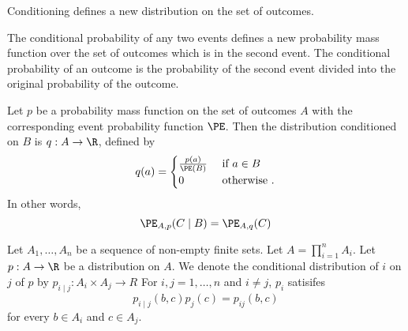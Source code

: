 

Conditioning defines a new distribution on the set of outcomes.


The conditional probability
of any two events
defines a new probability
mass function over the
set of outcomes
which is in the second
event.
The conditional probability
of an outcome
is the probability of the
second event
divided into the original probability
of the outcome.


Let $p$ be a probability
mass function on the set of
outcomes $A$ with the corresponding
event probability function $\PE$.
Then the distribution conditioned on $B$ is $q: A \to \R$, defined by
\[
  q(a) = \begin{cases}
    \frac{p(a)}{\PE(B)} & \text{ if } a \in B \\
    0 & \text{ otherwise }.
  \end{cases}
\]
In other words,
\[
   \PE_{A, p}(C \mid B) = \PE_{A,q}(C)
\]



Let $A_1, \dots, A_n$ be a sequence of non-empty finite sets.
Let $A = \prod_{i = 1}^{n} A_i$.
Let $p: A \to \R$ be a distribution on $A$.
We denote the conditional distribution of $i$ on $j$ of $p$ by $p_{i \mid j}: A_i \times A_j \to R$
For $i,j = 1, \dots, n$ and $i \neq j$, $p_i$ satisifes
\[
  p_{i \mid j}(b, c)p_{j}(c) = p_{ij}(b, c)
\]
for every $b \in A_i$ and $c \in A_j$.
